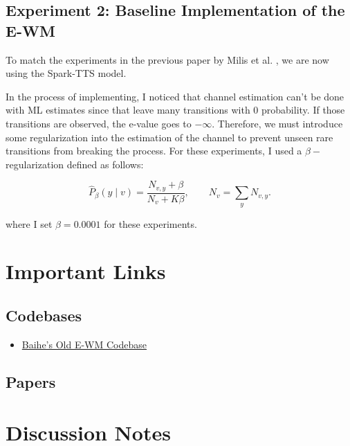 \documentclass[12pt]{article}
\theoremstyle{plain}
\theoremstyle{definition}
\begin{document}
\subsection{Experiment 2: Baseline Implementation of the E-WM}
To match the experiments in the previous paper by Milis et al. \cite{milis2026hidden}, we are now using the Spark-TTS model.

In the process of implementing, I noticed that channel estimation can't be done with ML estimates since that leave many transitions with $0$ probability. If those transitions are observed, the e-value goes to $-\infty$. Therefore, we must introduce some regularization into the estimation of the channel to prevent unseen rare transitions from breaking the process. For these experiments, I used a $\beta-$regularization defined as follows:

\begin{equation}
\widehat P_\beta(y\mid v)=
\frac{N_{v,y}+\beta}{N_v+K\beta},
\qquad N_v=\sum_y N_{v,y}.
\end{equation}

where I set $\beta=0.0001$ for these experiments. 



\section{Important Links}
\subsection{Codebases}
\begin{itemize}
    \item \href{https://github.com/realgourmet/e-watermark}{Baihe's Old E-WM Codebase}
\end{itemize}
\subsection{Papers}



\section{Discussion Notes}
\end{document}

